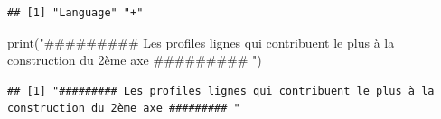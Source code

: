 \documentclass[
]{article}
\newenvironment{Shaded}{\begin{snugshade}}{\end{snugshade}}
\newcommand{\AttributeTok}[1]{\textcolor[rgb]{0.77,0.63,0.00}{#1}}
\newcommand{\ControlFlowTok}[1]{\textcolor[rgb]{0.13,0.29,0.53}{\textbf{#1}}}
\newcommand{\DecValTok}[1]{\textcolor[rgb]{0.00,0.00,0.81}{#1}}
\newcommand{\FunctionTok}[1]{\textcolor[rgb]{0.00,0.00,0.00}{#1}}
\newcommand{\NormalTok}[1]{#1}
\newcommand{\OtherTok}[1]{\textcolor[rgb]{0.56,0.35,0.01}{#1}}
\newcommand{\SpecialCharTok}[1]{\textcolor[rgb]{0.00,0.00,0.00}{#1}}
\newcommand{\StringTok}[1]{\textcolor[rgb]{0.31,0.60,0.02}{#1}}
\begin{document}
\begin{verbatim}
## [1] "Language" "+"
\end{verbatim}

\begin{Shaded}
\begin{Highlighting}[]
\FunctionTok{print}\NormalTok{(}\StringTok{"\#\#\#\#\#\#\#\#\# Les profiles lignes qui contribuent le plus à la construction du 2ème axe \#\#\#\#\#\#\#\#\# "}\NormalTok{)}
\end{Highlighting}
\end{Shaded}

\begin{verbatim}
## [1] "######### Les profiles lignes qui contribuent le plus à la construction du 2ème axe ######### "
\end{verbatim}

\begin{Shaded}
\end{Shaded}
\end{document}
